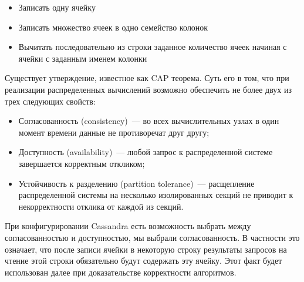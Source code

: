 \begin{itemize}
	\item Записать одну ячейку
	\item Записать множество ячеек в одно семейство колонок
	\item Вычитать последовательно из строки заданное количество ячеек начиная с ячейки с заданным именем колонки
\end{itemize}

Существует утверждение, известное как CAP теорема. Суть его в том, что при реализации распределенных вычислений возможно обеспечить не более двух из трех следующих свойств:

\begin{itemize}
	\item Согласованность (consistency)~--- во всех вычислительных узлах в один момент времени данные не противоречат друг другу;
	\item Доступность (availability)~--- любой запрос к распределенной системе завершается корректным откликом;
	\item Устойчивость к разделению (partition tolerance)~--- расщепление распределенной системы на несколько изолированных секций не приводит к некорректности отклика от каждой из секций.
\end{itemize}

При конфигурировании Cassandra есть возможность выбрать между согласованностью и доступностью, мы выбрали согласованность. В частности это означает, что после записи ячейки в некоторую строку результаты запросов на чтение этой строки обязательно будут содержать эту ячейку. Этот факт будет использован далее при доказательстве корректности алгоритмов.